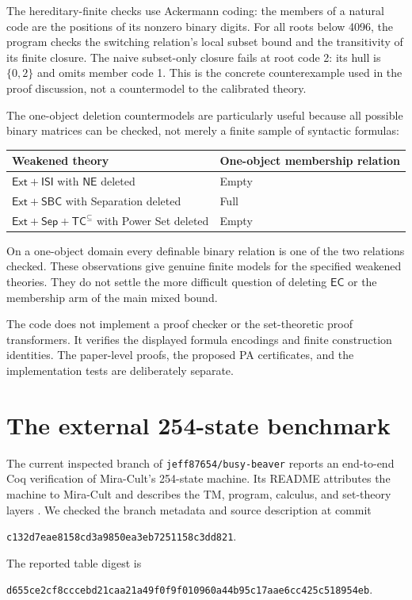 \documentclass[11pt,letterpaper]{article}
\theoremstyle{definition}\newtheorem{definition}[theorem]{Definition}
\theoremstyle{remark}\newtheorem{remark}[theorem]{Remark}
\newcommand{\Ext}{\mathsf{Ext}}
\newcommand{\Sep}{\mathsf{Sep}}
\newcommand{\SBC}{\mathsf{SBC}}
\newcommand{\ISI}{\mathsf{ISI}}
\newcommand{\TC}{\mathsf{TC}}
\newcommand{\EC}{\mathsf{EC}}
\newcommand{\NE}{\mathsf{NE}}
\begin{document}
The hereditary-finite checks use Ackermann coding: the members of a
natural code are the positions of its nonzero binary digits. For all
roots below 4096, the program checks the switching relation's local
subset bound and the transitivity of its finite closure. The naive
subset-only closure fails at root code 2: its hull is $\{0,2\}$ and
omits member code 1. This is the concrete counterexample used in the
proof discussion, not a countermodel to the calibrated theory.

The one-object deletion countermodels are particularly useful because
all possible binary matrices can be checked, not merely a finite
sample of syntactic formulas:
\begin{center}
\begin{tabular}{p{.60\linewidth}p{.29\linewidth}}
\toprule
Weakened theory & One-object membership relation\\
\midrule
$\Ext+\ISI$ with $\NE$ deleted & Empty\\
$\Ext+\SBC$ with Separation deleted & Full\\
$\Ext+\Sep+\TC^{\subseteq}$ with Power Set deleted & Empty\\
\bottomrule
\end{tabular}
\end{center}

On a one-object domain every definable binary relation is one of the two
relations checked. These observations give genuine finite models for
the specified weakened theories. They do not settle the more difficult
question of deleting $\EC$ or the membership arm of the main mixed
bound.

The code does not implement a proof checker or the set-theoretic proof
transformers. It verifies the displayed formula encodings and finite
construction identities. The paper-level proofs, the proposed PA
certificates, and the implementation tests are deliberately separate.

\section{The external 254-state benchmark}
\label{sec:benchmark}

The current inspected branch of \texttt{jeff87654/busy-beaver} reports an
end-to-end Coq verification of Mira-Cult's 254-state machine. Its README
attributes the machine to Mira-Cult and describes the TM, program,
calculus, and set-theory layers \cite{upstream}. We checked the branch
metadata and source description at commit
\begin{center}\small
\texttt{c132d7eae8158cd3a9850ea3eb7251158c3dd821}.
\end{center}
The reported table digest is
\begin{center}\small
\texttt{d655ce2cf8cccebd21caa21a49f0f9f010960a44b95c17aae6cc425c518954eb}.
\end{center}
\end{document}

